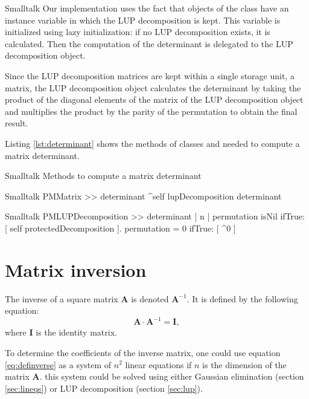 \begin{displaycode}{Smalltalk}
Our implementation uses the fact that objects of the class  have an instance variable in which the LUP decomposition
is kept. This variable is initialized using lazy initialization:
if no LUP decomposition exists, it is calculated. Then the
computation of the determinant is delegated to the LUP
decomposition object.

Since the LUP decomposition matrices are kept within a single
storage unit, a matrix, the LUP decomposition object calculates
the determinant by taking the product of the diagonal elements of
the matrix of the LUP decomposition object and multiplies the
product by the parity of the permutation to obtain the final
result.

Listing \ref{lst:determinant} shows the methods of classes  and  needed to compute a matrix determinant.

\begin{listing}[label=lst:determinant]{Smalltalk}
{Methods to compute a matrix determinant}
\end{listing}
\begin{displaycode}{Smalltalk}
PMMatrix >> determinant
  ^self lupDecomposition determinant
\end{displaycode}

\begin{displaycode}{Smalltalk}
PMLUPDecomposition >> determinant
    | n |
    permutation isNil
        ifTrue: [ self protectedDecomposition ].
    permutation = 0
        ifTrue: [ ^0 ]  
\end{displaycode}

\section{Matrix inversion}
\label{sec:matrixinversion} The inverse of a square matrix $\textbf{A}$ is denoted $\textbf{A}^{-1}$. It is defined by the following
equation:
\begin{equation}
\label{eq:definverse} \textbf{A}\cdot\textbf{A}^{-1}=\textbf{I},
\end{equation}
where $\textbf{I}$ is the identity matrix.

To determine the coefficients of the inverse matrix, one could use
equation \ref{eq:definverse} as a system of $n^2$ linear equations
if $n$ is the dimension of the matrix $\textbf{A}$. this system could
be solved using either Gaussian elimination (\cf section
\ref{sec:lineqs}) or LUP decomposition (\cf section
\ref{sec:lup}).


\end{displaycode}
